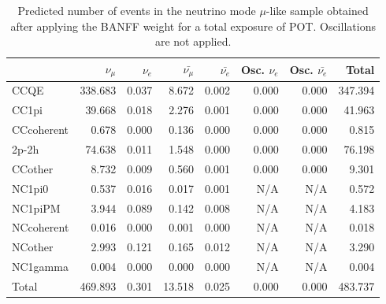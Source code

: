 
\begin{table}
\center
\begin{tabular} { | l ||r | r | r | r | r | r | | r | }
\hline
              & $\nu_\mu$            & $\nu_e$              & $\bar{\nu_\mu}$      & $\bar{\nu_e}$        & Osc. $\nu_e$         & Osc. $\bar{\nu_e}$   & Total                \\ \hline\hline
 CCQE         & 338.683              & 0.037                & 8.672                & 0.002                & 0.000                & 0.000                & 347.394              \\ \hline
 CC1pi        & 39.668               & 0.018                & 2.276                & 0.001                & 0.000                & 0.000                & 41.963               \\ \hline
 CCcoherent   & 0.678                & 0.000                & 0.136                & 0.000                & 0.000                & 0.000                & 0.815                \\ \hline
 2p-2h          & 74.638               & 0.011                & 1.548                & 0.000                & 0.000                & 0.000                & 76.198               \\ \hline
 CCother      & 8.732                & 0.009                & 0.560                & 0.001                & 0.000                & 0.000                & 9.301                \\ \hline
 NC1pi0       & 0.537                & 0.016                & 0.017                & 0.001                & N/A                  & N/A                  & 0.572                \\ \hline
 NC1piPM      & 3.944                & 0.089                & 0.142                & 0.008                & N/A                  & N/A                  & 4.183                \\ \hline
 NCcoherent   & 0.016                & 0.000                & 0.001                & 0.000                & N/A                  & N/A                  & 0.018                \\ \hline
 NCother      & 2.993                & 0.121                & 0.165                & 0.012                & N/A                  & N/A                  & 3.290                \\ \hline
 NC1gamma     & 0.004                & 0.000                & 0.000                & 0.000                & N/A                  & N/A                  & 0.004                \\ \hline
\hline
 Total        & 469.893              & 0.301                & 13.518               & 0.025                & 0.000                & 0.000                & 483.737              \\ \hline
\end{tabular}
\caption{
Predicted number of events in the neutrino mode $\mu$-like sample
obtained after applying the BANFF weight
for a total exposure of \TotalPotNu{} POT.
Oscillations are not applied.
}
\label{tab:events_1rmu_NoOsc}
\end{table}


